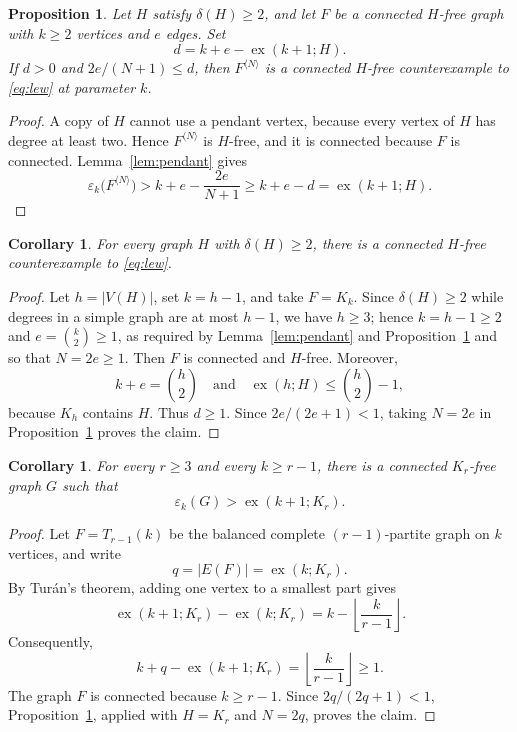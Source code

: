 \documentclass[11pt]{amsart}
\newtheorem{proposition}[theorem]{Proposition}
\newtheorem{corollary}[theorem]{Corollary}
\theoremstyle{remark}
\newcommand{\eps}{\varepsilon}
\newcommand{\ex}{\operatorname{ex}}
\begin{document}
\begin{proposition}\label{prop:amplification}
Let $H$ satisfy $\delta(H)\ge2$, and let $F$ be a connected $H$-free graph
with $k\ge2$ vertices and $e$ edges. Set
\[
  d=k+e-\ex(k+1;H).
\]
If $d>0$ and $2e/(N+1)\le d$, then $F^{\langle N\rangle}$ is a connected
$H$-free counterexample to \eqref{eq:lew} at parameter $k$.
\end{proposition}

\begin{proof}
A copy of $H$ cannot use a pendant vertex, because every vertex of $H$ has
degree at least two. Hence $F^{\langle N\rangle}$ is $H$-free, and it is
connected because $F$ is connected. Lemma~\ref{lem:pendant} gives
\[
\eps_k\bigl(F^{\langle N\rangle}\bigr)
>k+e-\frac{2e}{N+1}
\ge k+e-d
=\ex(k+1;H).
\]
\end{proof}

\begin{corollary}\label{cor:all-H}
For every graph $H$ with $\delta(H)\ge2$, there is a connected $H$-free
counterexample to \eqref{eq:lew}.
\end{corollary}

\begin{proof}
Let $h=|V(H)|$, set $k=h-1$, and take $F=K_k$. Since $\delta(H)\ge2$ while
degrees in a simple graph are at most $h-1$, we have $h\ge3$; hence $k=h-1\ge2$
and
$e=\binom{k}{2}\ge1$, as required by Lemma~\ref{lem:pendant} and
Proposition~\ref{prop:amplification} and so that $N=2e\ge1$. Then $F$ is
connected and $H$-free. Moreover,
\[
k+e=\binom{h}{2}
\quad\text{and}\quad
\ex(h;H)\le\binom{h}{2}-1,
\]
because $K_h$ contains $H$. Thus $d\ge1$. Since $2e/(2e+1)<1$, taking
$N=2e$ in Proposition~\ref{prop:amplification} proves the claim.
\end{proof}

\begin{corollary}\label{cor:complete}
For every $r\ge3$ and every $k\ge r-1$, there is a connected $K_r$-free
graph $G$ such that
\[
  \eps_k(G)>\ex(k+1;K_r).
\]
\end{corollary}

\begin{proof}
Let $F=T_{r-1}(k)$ be the balanced complete $(r-1)$-partite graph on $k$
vertices, and write
\[
q=|E(F)|=\ex(k;K_r).
\]
By Tur\'an's theorem, adding one vertex to a smallest part gives
\[
\ex(k+1;K_r)-\ex(k;K_r)
=k-\left\lfloor\frac{k}{r-1}\right\rfloor.
\]
Consequently,
\[
k+q-\ex(k+1;K_r)
=\left\lfloor\frac{k}{r-1}\right\rfloor\ge1.
\]
The graph $F$ is connected because $k\ge r-1$. Since
$2q/(2q+1)<1$, Proposition~\ref{prop:amplification}, applied with
$H=K_r$ and $N=2q$, proves the claim.
\end{proof}
\end{document}
